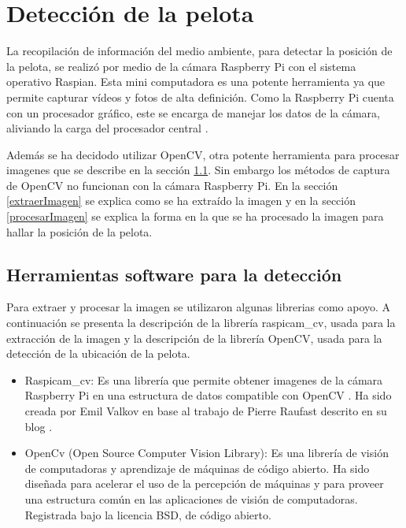 \section{Detección de la pelota}\label{chapter:deteccion}

La recopilación de información del medio ambiente, para detectar la posición de la pelota, se realiz\'o por medio de la cámara Raspberry Pi con el sistema operativo Raspian. Esta mini computadora es una potente herramienta ya que permite capturar v\'ideos y fotos de alta definici\'on. Como la Raspberry Pi cuenta con un procesador gr\'afico, este se encarga de manejar los datos de la cámara, aliviando la carga del procesador central \cite{raspCamArti}.

Además se ha decidodo utilizar OpenCV, otra potente herramienta para procesar imagenes que se describe en la sección \ref{herramientasDetc}. Sin embargo los métodos de captura de OpenCV no funcionan con la c\'amara Raspberry Pi. En la secci\'on \ref{extraerImagen} se explica como se ha extra\'ido la imagen y en la secci\'on \ref{procesarImagen} se explica la forma en la que se ha procesado la imagen para hallar la posición de la pelota. 

\subsection{Herramientas software para la detecci\'on }\label{herramientasDetc}

Para extraer y procesar la imagen se utilizaron algunas librerias como apoyo. A continuación se presenta la descripción de la librería raspicam\_cv, usada para la extracción de la imagen y la descripción de la librería OpenCV, usada para la detección de la ubicación de la pelota.   

\begin{itemize}

\item Raspicam\_cv: Es una librería que permite obtener imagenes de la cámara Raspberry Pi en una estructura de datos compatible con OpenCV \cite{emilV}. Ha sido creada por Emil Valkov en base al trabajo de Pierre Raufast descrito en su blog \cite{pierreR}.  

\item OpenCv (Open Source Computer Vision Library): Es una librería de visión de computadoras y aprendizaje de máquinas de código abierto. Ha sido diseñada para acelerar el uso de la percepción de m\'aquinas y para proveer una estructura común en las aplicaciones de visión de computadoras. Registrada bajo la licencia BSD, de código abierto. \cite{opencv}

\end{itemize}


